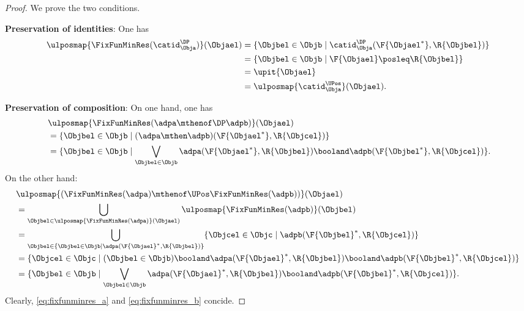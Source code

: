 \begin{proof}
	We prove the two conditions.

	\textbf{Preservation of identities}:
	One has
	\begin{equation*}
		\begin{aligned}
			\ulposmap{\FixFunMinRes(\catid_{\Obja}^{\DP})}(\Objael) & =\{ \Objbel\in \Objb\mid \catid_{\Obja}^{\DP}(\F{\Objael^*},\R{\Objbel})\} \\
			                                                        & =\{ \Objbel \in \Objb\mid \F{\Objael}\posleq\R{\Objbel}\}                  \\
			                                                        & =\upit \{ \Objael\}                                                        \\
			                                                        & =\ulposmap{\catid_{\Obja}^{\UPos}}(\Objael).
		\end{aligned}
	\end{equation*}

	\textbf{Preservation of composition}:
	On one hand, one has
	\begin{equation}
		\label{eq:fixfunminres_a}
		\begin{aligned}
			~ & \ulposmap{\FixFunMinRes(\adpa\mthenof\DP \adpb)}(\Objael)                                                                        \\
			  & =\{ \Objbel\in \Objb\mid (\adpa\mthen \adpb)(\F{\Objael^*},\R{\Objcel})\}                                                        \\
			  & =\{ \Objbel\in \Objb\mid \bigvee_{\Objbel \in \Objb}\adpa(\F{\Objael^*},\R{\Objbel})\booland \adpb(\F{\Objbel^*},\R{\Objcel})\}.
		\end{aligned}
	\end{equation}
	On the other hand:
	\begin{equation}
		\label{eq:fixfunminres_b}
		\begin{aligned}
			 & \ulposmap{(\FixFunMinRes(\adpa)\mthenof\UPos \FixFunMinRes(\adpb))}(\Objael)                                                                    \\
			 & =\bigcup_{\Objbel \in \ulposmap{\FixFunMinRes(\adpa)}(\Objael)}\ulposmap{\FixFunMinRes(\adpb)}(\Objbel)                                         \\
			 & =\bigcup_{\Objbel \in \{ \Objbel \in \Objb \mid \adpa(\F{\Objael}^*,\R{\Objbel})\}} \{\Objcel \in \Objc \mid \adpb(\F{\Objbel}^*,\R{\Objcel})\} \\
			 & =\{\Objcel\in \Objc \mid (\Objbel \in \Objb)\booland \adpa(\F{\Objael}^*,\R{\Objbel})\booland \adpb(\F{\Objbel}^*,\R{\Objcel})\}                \\
			 & =\{ \Objbel\in \Objb\mid \bigvee_{\Objbel \in \Objb}\adpa(\F{\Objael}^*,\R{\Objbel})\booland \adpb(\F{\Objbel}^*,\R{\Objcel})\}.
		\end{aligned}
	\end{equation}
	Clearly, \cref{eq:fixfunminres_a} and \cref{eq:fixfunminres_b} concide.
\end{proof}

